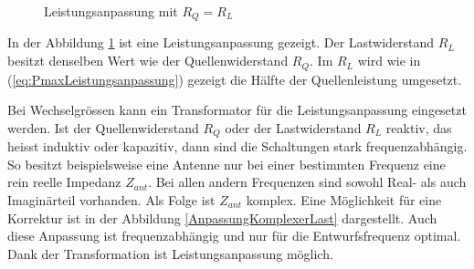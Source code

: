 \begin{figure}[!ht]
	\begin{center}
	\end{center}
\caption{Leistungsanpassung mit $R_Q = R_L$}
\label{fig:LeistungsanpassungU0_RQ_RL}
\end{figure}

In der Abbildung \ref{fig:LeistungsanpassungU0_RQ_RL} ist eine Leistungsanpassung gezeigt. 
Der Lastwiderstand $R_{L}$ besitzt denselben Wert wie der Quellenwiderstand $R_{Q}$. Im $R_{L}$ wird wie in  (\ref{eq:PmaxLeistungsanpassung}) gezeigt die Hälfte der Quellenleistung umgesetzt.

Bei Wechselgrössen kann ein Transformator für die Leistungsanpassung eingesetzt werden. Ist der Quellenwiderstand $R_Q$ oder der Lastwiderstand $R_L$  reaktiv, das heisst induktiv oder kapazitiv, dann sind die Schaltungen stark frequenzabhängig. So besitzt beispielsweise eine Antenne nur bei einer bestimmten Frequenz eine rein reelle Impedanz $Z_{ant}$. Bei allen andern Frequenzen sind sowohl Real- als auch Imaginärteil vorhanden. Als Folge ist $Z_{ant}$  komplex. Eine Möglichkeit für eine Korrektur ist in der Abbildung \ref{AnpassungKomplexerLast} dargestellt. Auch diese  Anpassung ist frequenzabhängig und nur für die Entwurfsfrequenz optimal. Dank der Transformation ist Leistungsanpassung möglich.


